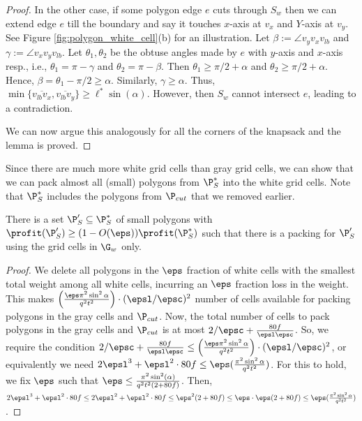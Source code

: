 \begin{proof}
In the other case, if some polygon edge $e$ cuts through $S_w$ then we can extend edge $e$ till the boundary and say it touches $x$-axis at $v_x$ and $Y$-axis at $v_y$. See Figure \ref{fig:polygon_white_cell}(b) for an illustration.  
Let $\beta:=\angle v_y v_x v_{lb}$  and $\gamma:=\angle v_x v_y v_{lb}$.
Let  $\theta_1, \theta_2$ be the obtuse angles made by $e$ with $y$-axis and $x$-axis resp., i.e., $\theta_1=\pi-\gamma$ and $\theta_2=\pi-\beta$. Then $\theta_1\ge \pi/2+\alpha$ and $\theta_2\ge \pi/2+\alpha$. 
Hence, $\beta = \theta_1-\pi/2 \ge \alpha$. Similarly, $\gamma \ge \alpha$. Thus, $\min\{\overline{v_{lb}v_x},\overline{v_{lb}v_y}\}\ge \ell^* \sin (\alpha)$. 
However, then $S_w$ cannot intersect $e$, leading to a contradiction. 
	
	We can now argue this analogously for all the corners of the knapsack and the lemma is proved. 
\end{proof}

Since there are much more white grid cells than gray grid cells, we can show that we can pack almost all (small) polygons from $\P^*_S$ into the white grid cells. Note that  $\P^*_S$ includes the polygons from $\P_{cut}$ that we removed earlier.

\begin{lem} \label{lem:small-circles-white-grid-cells}There
	is a set $\P'_S \subseteq \P^*_S$ of small polygons with
	$\profit(\P'_S)\ge (1-O(\eps)) \profit(\P^*_S)$
	such that there is a packing for $\P'_S$ using the grid cells in $\G_w$ only.
\end{lem}
\begin{proof}
	We delete all polygons in the 
$\eps$ fraction of white cells with the smallest total
	weight among all white cells, incurring an $\eps$ fraction loss in the weight. 
 This makes $\left ( \frac{\eps \pi^2 \sin^2 \alpha}{q^2 t^2} \right )\cdot (\epsl/\epsc)^2$
 number of cells available for packing polygons in the gray cells and $\P_{cut}$. 
	Now, the total number of cells to pack polygons in the gray cells and $\P_{cut}$ is at most 
$2/\epsc+ \frac{80f}{\epsl \epsc}$.
 So, we require the condition $2/\epsc+ \frac{80f}{\epsl \epsc} \le \left ( \frac{\eps \pi^2 \sin^2 \alpha}{q^2 t^2} \right )\cdot (\epsl/\epsc)^2$, or equivalently we need $2 \epsl^3+\epsl^2 \cdot 80f \le \eps (\frac{\pi^2 \sin^2 \alpha}{q^2 t^2})$. 
 For this to hold, we fix $\eps$ such that $\eps \le \frac{\pi^2 \sin^2(\alpha)}{q^2t^2(2+80f)}$.
 Then, $2 \epsl^3+\epsl^2 \cdot 80f \le 2 \epsl^2+\epsl^2 \cdot 80f \le \eps^2(2+80f) \le \eps \cdot \eps(2+80f) \le \eps (\frac{\pi^2 \sin^2 \alpha}{q^2 t^2})$.
\end{proof}

